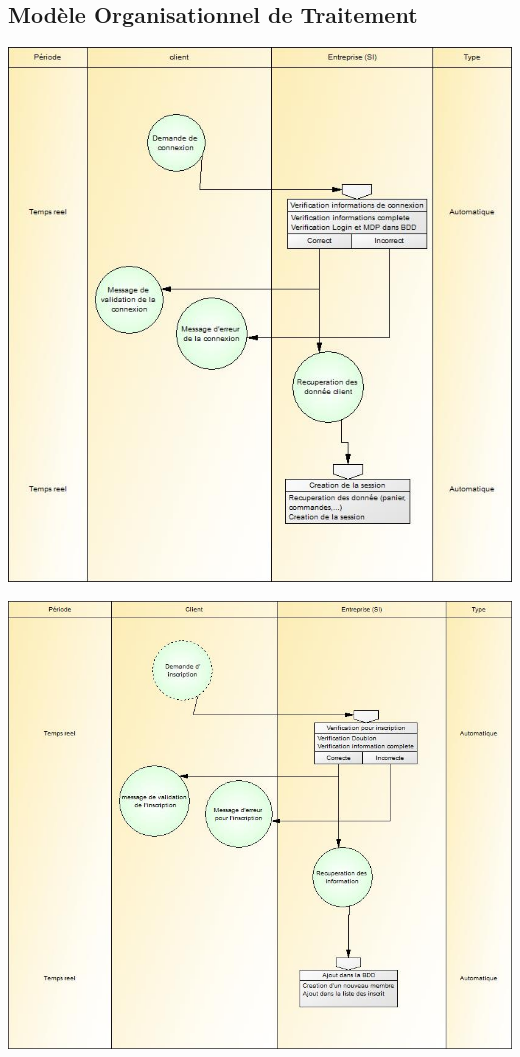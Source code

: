 \documentclass[12pt]{report}
\begin{document}
\begin{spacing}{1.2}
\chapter{Modèle Organisationnel de Traitement}
\newpage
\centerline{\includegraphics{mot_connexion.jpg}}
\centerline{\includegraphics{mot_inscription.jpg}}

\end{spacing}
\end{document}
